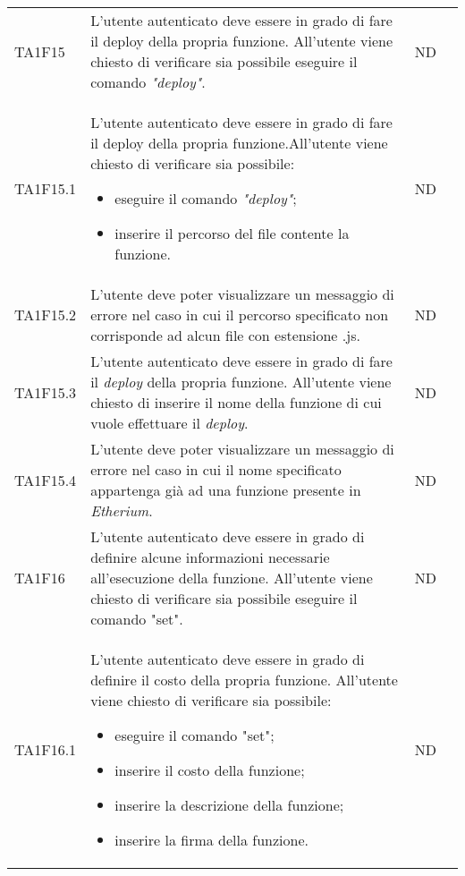 \begin{longtable}{|C{1.5cm}|C{8cm}|C{3cm}|C{1cm}|}
	TA1F15  &
	L'utente autenticato deve essere in grado di fare il deploy della propria funzione.
	All’utente viene chiesto di verificare sia possibile eseguire il comando \textit{"deploy\glos"}. &
	ND \\

	TA1F15.1  &
	L'utente autenticato deve essere in grado di fare il deploy della propria funzione.All’utente viene chiesto di verificare sia possibile:
	\begin{itemize}
		\item eseguire il comando \textit{"deploy"\glos};
		\item inserire il percorso del file contente la funzione.
	\end{itemize} &
	ND \\[-5ex]

	TA1F15.2  &
	L’utente deve poter visualizzare un messaggio di errore nel caso in cui il percorso specificato non corrisponde ad alcun file con estensione .js. &
	ND \\

	TA1F15.3  &
	L'utente autenticato deve essere in grado di fare il \textit{deploy\glo} della propria funzione. All’utente viene chiesto di inserire il nome della funzione di cui vuole effettuare il \textit{deploy\glos}. &
	ND \\

	TA1F15.4  &
	L’utente deve poter visualizzare un messaggio di errore nel caso in cui il nome specificato appartenga già ad una funzione presente in \textit{Etherium\glo}. &
	ND \\

	TA1F16  &
	L'utente autenticato deve essere in grado di definire alcune informazioni necessarie all'esecuzione della funzione. All’utente viene chiesto di verificare sia possibile eseguire il comando "set". &
	ND \\

	TA1F16.1  &
	L'utente autenticato deve essere in grado di definire il costo della propria funzione. All’utente viene chiesto di verificare sia possibile:
	\begin{itemize}
		\item eseguire il comando "set";
		\item inserire il costo della funzione;
		\item inserire la descrizione della funzione;
		\item inserire la firma della funzione.
	\end{itemize} &
	ND \\[-5ex]


\end{longtable}
